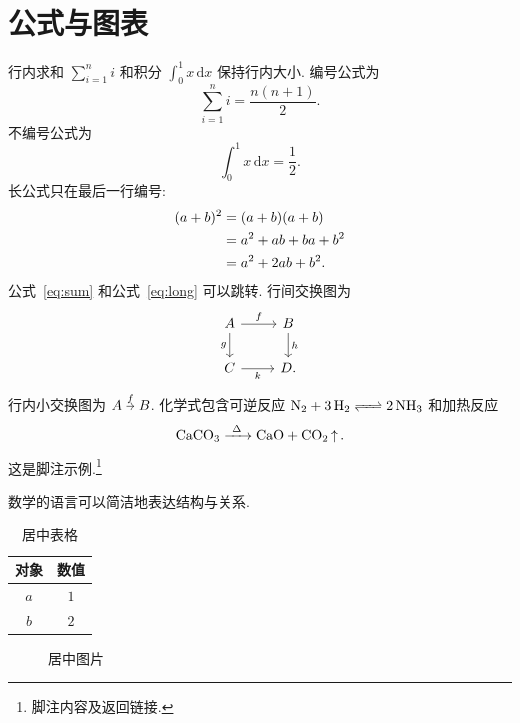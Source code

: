\documentclass[UTF8,12pt,oneside,fontset=fandol]{ctexbook}
\begin{document}
\section{公式与图表}
行内求和 $\sum_{i = 1}^{n} i$ 和积分 $\int_0^1 x\,\mathrm{d}x$
保持行内大小. 编号公式为
\begin{equation}\label{eq:sum}
    \sum_{i = 1}^{n} i = \frac{n(n + 1)}{2}.
\end{equation}
不编号公式为
\[
    \int_0^1 x\,\mathrm{d}x = \frac{1}{2}.
\]
长公式只在最后一行编号:
\begin{align}
    (a + b)^2 & = (a + b)(a + b) \notag \\
    & = a^2 + ab + ba + b^2 \notag \\
    & = a^2 + 2ab + b^2. \label{eq:long}
\end{align}
公式~\eqref{eq:sum} 和公式~\eqref{eq:long} 可以跳转.
行间交换图为
\[
    \begin{tikzcd}
        A \arrow[r, "f"] \arrow[d, "g"'] & B \arrow[d, "h"] \\
        C \arrow[r, "k"'] & D.
    \end{tikzcd}
\]
行内小交换图为
$\begin{tikzcd}[ampersand replacement=\&,cramped,sep=tiny]
    A \arrow[r, "f"] \& B
\end{tikzcd}$.
化学式包含可逆反应 $\ce{N2 + 3H2 <=> 2NH3}$ 和加热反应
\[
    \ce{CaCO3 ->[\Delta] CaO + CO2 ^}.
\]
这是脚注示例.\footnote{脚注内容及返回链接.}
\begin{quotationbox}
    数学的语言可以简洁地表达结构与关系.
\end{quotationbox}
\begin{table}[htbp]
    \centering
    \caption{居中表格}\label{tab:sample}
    \begin{tabular}{cc}
        \toprule
        对象 & 数值 \\
        \midrule
        $a$ & $1$ \\
        $b$ & $2$ \\
        \bottomrule
    \end{tabular}
\end{table}
\begin{figure}[htbp]
    \centering
    \caption{居中图片}\label{fig:single}
\end{figure}
\end{document}

